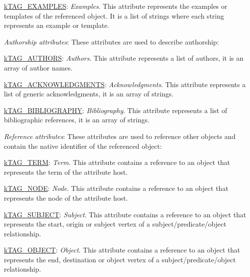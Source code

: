 \begin{DoxyItemize}
\begin{DoxyItemize}
\item {\ttfamily \hyperlink{}{k\-T\-A\-G\-\_\-\-E\-X\-A\-M\-P\-L\-E\-S}}\-: {\itshape Examples}. This attribute represents the examples or templates of the referenced object. It is a list of strings where each string represents an example or template. 
\end{DoxyItemize}
\item {\itshape Authorship attributes}\-: These attributes are used to describe authorship\-: 
\begin{DoxyItemize}
\item {\ttfamily \hyperlink{}{k\-T\-A\-G\-\_\-\-A\-U\-T\-H\-O\-R\-S}}\-: {\itshape Authors}. This attribute represents a list of authors, it is an array of author names. 
\item {\ttfamily \hyperlink{}{k\-T\-A\-G\-\_\-\-A\-C\-K\-N\-O\-W\-L\-E\-D\-G\-M\-E\-N\-T\-S}}\-: {\itshape Acknowledgments}. This attribute represents a list of generic acknowledgments, it is an array of strings. 
\item {\ttfamily \hyperlink{}{k\-T\-A\-G\-\_\-\-B\-I\-B\-L\-I\-O\-G\-R\-A\-P\-H\-Y}}\-: {\itshape Bibliography}. This attribute represents a list of bibliographic references, it is an array of strings. 
\end{DoxyItemize}
\item {\itshape Reference attributes}\-: These attributes are used to reference other objects and contain the native identifier of the referenced object\-: 
\begin{DoxyItemize}
\item {\ttfamily \hyperlink{}{k\-T\-A\-G\-\_\-\-T\-E\-R\-M}}\-: {\itshape Term}. This attribute contains a reference to an object that represents the term of the attribute host. 
\item {\ttfamily \hyperlink{}{k\-T\-A\-G\-\_\-\-N\-O\-D\-E}}\-: {\itshape Node}. This attribute contains a reference to an object that represents the node of the attribute host. 
\item {\ttfamily \hyperlink{}{k\-T\-A\-G\-\_\-\-S\-U\-B\-J\-E\-C\-T}}\-: {\itshape Subject}. This attribute contains a reference to an object that represents the start, origin or subject vertex of a {\ttfamily subject}/{\ttfamily predicate}/{\ttfamily object} relationship. 
\item {\ttfamily \hyperlink{}{k\-T\-A\-G\-\_\-\-O\-B\-J\-E\-C\-T}}\-: {\itshape Object}. This attribute contains a reference to an object that represents the end, destination or object vertex of a {\ttfamily subject}/{\ttfamily predicate}/{\ttfamily object} relationship. 

\end{DoxyItemize}
\end{DoxyItemize}
